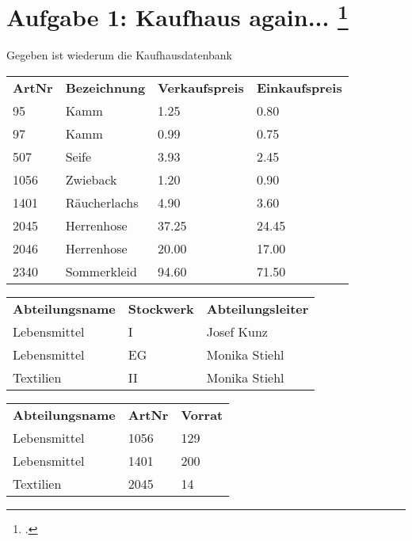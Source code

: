 \documentclass{lehramt-informatik-aufgabe}
\begin{document}

\section{Aufgabe 1: Kaufhaus again...
\footcite{db:ab:7}}

Gegeben ist wiederum die Kaufhausdatenbank


\begin{tabular}{llll}
\textbf{ArtNr} & \textbf{Bezeichnung}  & \textbf{Verkaufspreis} & \textbf{Einkaufspreis} \\
95    & Kamm         & 1.25          & 0.80          \\
97    & Kamm         & 0.99          & 0.75          \\
507   & Seife        & 3.93          & 2.45          \\
1056  & Zwieback     & 1.20          & 0.90          \\
1401  & Räucherlachs & 4.90          & 3.60          \\
2045  & Herrenhose   & 37.25         & 24.45         \\
2046  & Herrenhose   & 20.00         & 17.00         \\
2340  & Sommerkleid  & 94.60         & 71.50
\end{tabular}


\begin{tabular}{lll}
\textbf{Abteilungsname} & \textbf{Stockwerk} & \textbf{Abteilungsleiter} \\
Lebensmittel   & I         & Josef Kunz       \\
Lebensmittel   & EG        & Monika Stiehl    \\
Textilien      & II        & Monika Stiehl
\end{tabular}


\begin{tabular}{lll}
\textbf{Abteilungsname}  & \textbf{ArtNr} & \textbf{Vorrat} \\
Lebensmittel    & 1056  & 129    \\
Lebensmittel    & 1401  & 200    \\
Textilien       & 2045  & 14
\end{tabular}
\end{document}
